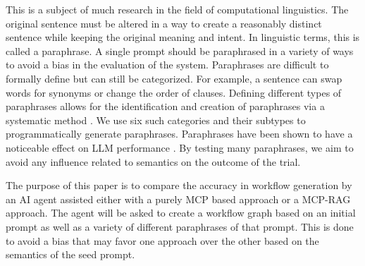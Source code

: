 This is a subject of much research in the field of computational linguistics. The original
sentence must be altered in a way to create a reasonably distinct sentence while keeping the
original meaning and intent. In linguistic terms, this is called a paraphrase. A single prompt
should be paraphrased in a variety of ways to avoid a bias in the evaluation of the system.
Paraphrases are difficult to formally define but can still be categorized. For example, a
sentence can swap words for synonyms or change the order of clauses. Defining different types of
paraphrases allows for the identification and creation of paraphrases via a systematic method
\citep{vila2014}. We use six such categories and their subtypes to programmatically generate
paraphrases. Paraphrases have been shown to have a noticeable effect on LLM performance
\citep{wahle2024}. By testing many paraphrases, we aim to avoid any influence related to
semantics on the outcome of the trial.

The purpose of this paper is to compare the accuracy in workflow generation by an AI agent
assisted either with a purely MCP based approach or a MCP-RAG approach. The agent will be asked
to create a workflow graph based on an initial prompt as well as a variety of different
paraphrases of that prompt. This is done to avoid a bias that may favor one approach over the
other based on the semantics of the seed prompt.
